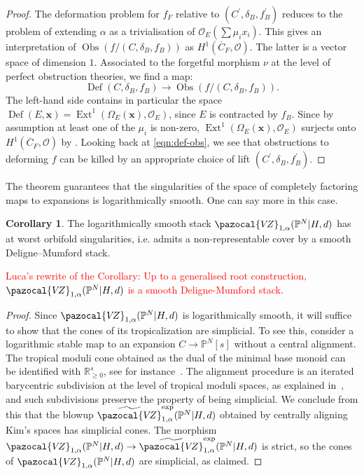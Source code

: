 \documentclass[11pt]{amsart}
\newcommand{\VZ}{\pazocal{V\!Z}}
\newcommand{\OO}{\mathcal{O}}
\renewcommand{\to}{\rightarrow}
\theoremstyle{definition}
\newtheorem{cor}[thm]{Corollary}
\theoremstyle{definition}
\begin{document}
\begin{proof}
The deformation problem for $f_F$ relative to $(C^\prime,\delta_B,f_B^\prime)$ reduces to the problem of extending $\alpha$ as a trivialisation of $\OO_E(\sum\mu_i x_i)$. This gives an interpretation of $\operatorname{Obs}(f/(C,\delta_B,f_B))$ as $H^1(\overline C_F,\OO)$. The latter is a vector space of dimension $1$. Associated to the forgetful morphism $\nu$ at the level of perfect obstruction theories, we find a map:
\begin{equation}\label{eqn:def-obs}\operatorname{Def}(C,\delta_B,f_B)\to \operatorname{Obs}(f/(C,\delta_B,f_B)).\end{equation}
The left-hand side contains in particular the space $\operatorname{Def}(E,\mathbf{x})=\operatorname{Ext}^1(\Omega_E(\mathbf x),\OO_E)$, since $E$ is contracted by $f_B$. Since by assumption at least one of the $\mu_i$ is non-zero, $\operatorname{Ext}^1(\Omega_E(\mathbf x),\OO_E)$ surjects onto $H^1(\overline C_F,\OO)$ by \cite[Corollary 3.5.3]{RSPW2}. Looking back at \eqref{eqn:def-obs}, we see that obstructions to deforming $f$ can be killed by an appropriate choice of lift $(C^\prime,\delta_B,f_B^\prime)$.


\end{proof}

The theorem guarantees that the singularities of the space of completely factoring maps to expansions is logarithmically smooth. One can say more in this case.

\begin{cor}
The logarithmically smooth stack $\VZ_{1,\alpha}(\mathbb P^N|H,d)$ has at worst orbifold singularities, i.e. admits a non-representable cover by a smooth Deligne--Mumford stack.
\end{cor}

\textcolor{red}{Luca's rewrite of the Corollary: Up to a generalised root construction, $\VZ_{1,\alpha}(\mathbb P^N|H,d)$ is a smooth Deligne-Mumford stack.}

\begin{proof}
Since $\VZ_{1,\alpha}(\mathbb P^N|H,d)$ is logarithmically smooth, it will suffice to show that the cones of its tropicalization are simplicial. To see this, consider a logarithmic stable map to an expansion $C\to \mathbb P^N[s]$ without a central alignment. The tropical moduli cone obtained as the dual of the minimal base monoid can be identified with $\mathbb R_{\geq 0}^{s}$, see for instance~\cite[Section~2.2]{ChenDegeneration}. The alignment procedure is an iterated barycentric subdivision at the level of tropical moduli spaces, as explained in~\cite[Section 4.6]{RSPW}, and such subdivisions preserve the property of being simplicial. We conclude from this that the blowup $\widetilde{\VZ}^{\mathrm{exp}}_{1,\alpha}(\mathbb P^N|H,d)$ obtained by centrally aligning Kim's spaces has simplicial cones. The morphism $\VZ_{1,\alpha}(\mathbb P^N|H,d)\to \widetilde{\VZ}^{\mathrm{exp}}_{1,\alpha}(\mathbb P^N|H,d)$ is strict, so the cones of $\VZ_{1,\alpha}(\mathbb P^N|H,d)$ are simplicial, as claimed.
\end{proof}
\end{document}
